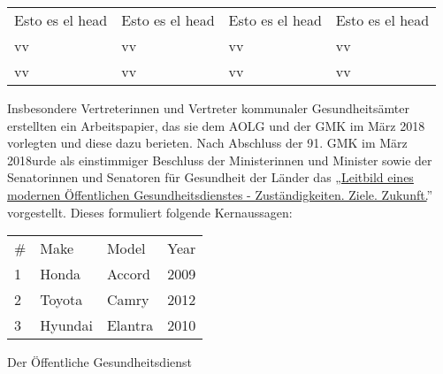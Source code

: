 \documentclass{article}
\begin{document}
\begin{tabu} to \textwidth { |X|X|X|X| }
\hline



Esto es el head & Esto es el head & Esto es el head & Esto es el head
 \\


vv & vv & vv & vv
 \\


vv & vv & vv & vv
 \\
\hline

\end{tabu}




Insbesondere Vertreterinnen und Vertreter kommunaler Gesundheitsämter erstellten ein Arbeitspapier, das sie dem AOLG und der GMK im März 2018 vorlegten und diese dazu berieten. Nach Abschluss der 91. GMK im März 2018urde als einstimmiger Beschluss der Ministerinnen und Minister sowie der Senatorinnen und Senatoren für Gesundheit der Länder das „\href{https://www.akademie-oegw.de/die-akademie/leitbild-oegd.html}{Leitbild eines modernen Öffentlichen Gesundheitsdienstes - Zuständigkeiten. Ziele. Zukunft.}” vorgestellt. Dieses formuliert folgende Kernaussagen:


\begin{tabu} to \textwidth { |X|X|X|X| }
\hline



\# & Make & Model & Year
 \\


1 & Honda & Accord & 2009
 \\


2 & Toyota & Camry & 2012
 \\


3 & Hyundai & Elantra & 2010
 \\
\hline

\end{tabu}




Der Öffentliche Gesundheitsdienst
\end{document}

